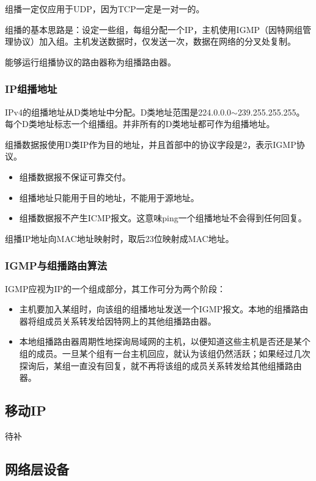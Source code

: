\documentclass[12pt, a4paper, oneside]{ctexart}
\begin{document}
组播一定仅应用于UDP，因为TCP一定是一对一的。

组播的基本思路是：设定一些组，每组分配一个IP，主机使用IGMP（因特网组管理协议）加入组。主机发送数据时，仅发送一次，数据在网络的分叉处复制。

能够运行组播协议的路由器称为组播路由器。

\subsubsection{IP组播地址}

IPv4的组播地址从D类地址中分配。D类地址范围是224.0.0.0$\sim$239.255.255.255。每个D类地址标志一个组播组。并非所有的D类地址都可作为组播地址。

组播数据报使用D类IP作为目的地址，并且首部中的协议字段是2，表示IGMP协议。

\begin{itemize}
    \item 组播数据报不保证可靠交付。
    \item 组播地址只能用于目的地址，不能用于源地址。
    \item 组播数据报不产生ICMP报文。这意味ping一个组播地址不会得到任何回复。
\end{itemize}

组播IP地址向MAC地址映射时，取后23位映射成MAC地址。

\subsubsection{IGMP与组播路由算法}

IGMP应视为IP的一个组成部分，其工作可分为两个阶段：
\begin{itemize}
    \item 主机要加入某组时，向该组的组播地址发送一个IGMP报文。本地的组播路由器将组成员关系转发给因特网上的其他组播路由器。
    \item 本地组播路由器周期性地探询局域网的主机，以便知道这些主机是否还是某个组的成员。一旦某个组有一台主机回应，就认为该组仍然活跃；如果经过几次探询后，某组一直没有回复，就不再将该组的成员关系转发给其他组播路由器。
\end{itemize}

\subsection{移动IP}

待补

\subsection{网络层设备}
\end{document}
